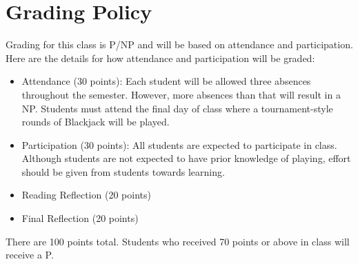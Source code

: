 \documentclass{article}
\begin{document}
\section{Grading Policy}
Grading for this class is P/NP and will be based on attendance and participation. Here are the details for how attendance and participation will be graded:
\newline
\begin{itemize}
	\item Attendance (30 points): Each student will be allowed three absences throughout the semester. However, more absences than that will result in a NP. Students must attend the final day of class where a tournament-style rounds of Blackjack will be played.
    \item Participation (30 points): All students are expected to participate in class. Although students are not expected to have prior knowledge of playing, effort should be given from students towards learning. 
    \item Reading Reflection (20 points)
    \item Final Reflection (20 points)
    
\end{itemize}
There are 100 points total. Students who received 70 points or above in class will receive a P.  
\end{document}
